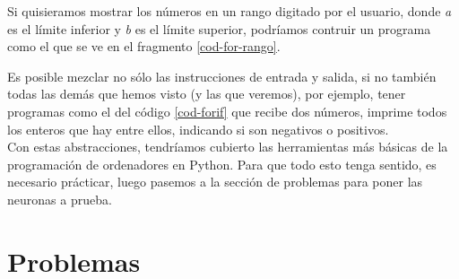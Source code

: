 Si quisieramos mostrar los números en un rango digitado por el usuario, donde \emph{a} es el límite inferior y \emph{b} es el límite superior, podríamos contruir un programa como el que se ve en el fragmento \ref{cod-for-rango}.



Es posible mezclar no sólo las instrucciones de entrada y salida, si no también todas las demás que hemos visto (y las que veremos), por ejemplo, tener programas como el del código \ref{cod-forif} que recibe dos números, imprime todos los enteros que hay entre ellos, indicando si son negativos o positivos. \\




Con estas abstracciones, tendríamos cubierto las herramientas más básicas de la programación de ordenadores en Python. Para que todo esto tenga sentido, es necesario prácticar, luego pasemos a la sección de problemas para poner las neuronas a prueba.

\section{Problemas}



\newpage